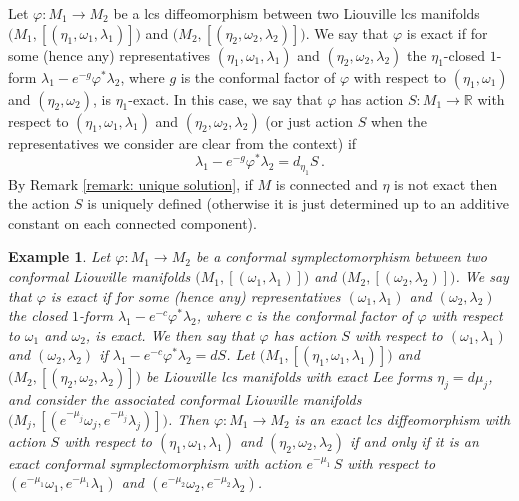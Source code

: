 \documentclass{amsart}
\newtheorem{example}[thm]{Example}
\theoremstyle{remark}
\begin{document}
Let $\varphi: M_1 \rightarrow M_2$
be a lcs diffeomorphism
between two Liouville lcs manifolds
$\big(M_1, [(\eta_1, \omega_1, \lambda_1)]\big)$
and $\big(M_2, [(\eta_2, \omega_2, \lambda_2)]\big)$.
We say that $\varphi$ is exact
if for some (hence any) representatives
$(\eta_1, \omega_1, \lambda_1)$ and $(\eta_2, \omega_2, \lambda_2)$
the $\eta_1$-closed $1$-form $\lambda_1 - e^{-g} \varphi^{\ast}\lambda_2$,
where $g$ is the conformal factor of $\varphi$
with respect to $(\eta_1, \omega_1)$ and $(\eta_2, \omega_2)$,
is $\eta_1$-exact.
In this case,
we say that $\varphi$ has action $S: M_1 \rightarrow \mathbb{R}$
with respect to $(\eta_1, \omega_1, \lambda_1)$ and $(\eta_2, \omega_2, \lambda_2)$
(or just action $S$
when the representatives we consider are clear from the context)
if
\[
\lambda_1 - e^{-g} \varphi^{\ast}\lambda_2 = d_{\eta_1}S \,.
\]
By Remark \ref{remark: unique solution},
if $M$ is connected and $\eta$ is not exact
then the action $S$ is uniquely defined
(otherwise it is just determined up to an additive constant
on each connected component).

\begin{example}\label{example: exact lcs on conformal}
Let $\varphi: M_1 \rightarrow M_2$
be a conformal symplectomorphism
between two conformal Liouville manifolds
$\big( M_1, [(\omega_1, \lambda_1)] \big)$
and $\big( M_2, [(\omega_2, \lambda_2)] \big)$.
We say that $\varphi$ is exact
if for some (hence any) representatives
$(\omega_1, \lambda_1)$ and $(\omega_2, \lambda_2)$
the closed $1$-form $\lambda_1 - e^{-c} \varphi^{\ast}\lambda_2$,
where $c$ is the conformal factor of $\varphi$
with respect to $\omega_1$ and $\omega_2$,
is exact.
We then say that $\varphi$ has action $S$
with respect to $(\omega_1, \lambda_1)$ and $(\omega_2, \lambda_2)$
if $\lambda_1 - e^{-c} \varphi^{\ast}\lambda_2 = dS$.
Let $\big(M_1, [(\eta_1, \omega_1, \lambda_1)]\big)$
and $\big(M_2, [(\eta_2, \omega_2, \lambda_2)]\big)$
be Liouville lcs manifolds
with exact Lee forms $\eta_j = d\mu_j$,
and consider the associated conformal Liouville manifolds
$\big(M_j, [(e^{-\mu_j}\omega_j, e^{-\mu_j}\lambda_j)]\big)$.
Then $\varphi: M_1 \rightarrow M_2$ is an exact lcs diffeomorphism
with action $S$ with respect to $(\eta_1, \omega_1, \lambda_1)$
and $(\eta_2, \omega_2, \lambda_2)$
if and only if it is an exact conformal symplectomorphism
with action $e^{-\mu_1} \, S$
with respect to $(e^{-\mu_1}\omega_1, e^{-\mu_1} \lambda_1)$
and $(e^{-\mu_2}\omega_2, e^{-\mu_2} \lambda_2)$.
\end{example}
\end{document}
